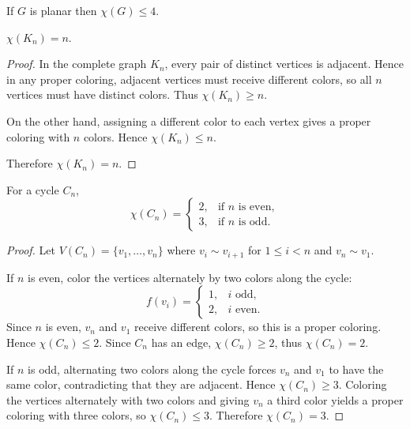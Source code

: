 \documentclass[11pt, a4paper]{ctexrep}
\begin{document}
\begin{theorem}
    If $G$ is planar then $ \chi(G) \le 4 $.
\end{theorem}

\begin{corollary}
    $\chi(K_n)=n$.
\end{corollary}

\begin{proof}
    In the complete graph $K_n$, every pair of distinct vertices is adjacent.
    Hence in any proper coloring, adjacent vertices must receive different
    colors, so all $n$ vertices must have distinct colors. Thus $\chi(K_n)\ge n$.

    On the other hand, assigning a different color to each vertex gives a
    proper coloring with $n$ colors. Hence $\chi(K_n)\le n$.

    Therefore $\chi(K_n)=n$.
\end{proof}

\begin{corollary}
    For a cycle $C_n$,
    \[
        \chi(C_n)=
        \begin{cases}
            2, & \text{if } n \text{ is even}, \\
            3, & \text{if } n \text{ is odd}.
        \end{cases}
    \]
\end{corollary}

\begin{proof}
    Let $V(C_n)=\{v_1,\ldots,v_n\}$ where $v_i\sim v_{i+1}$ for $1\le i<n$ and
    $v_n\sim v_1$.

    If $n$ is even, color the vertices alternately by two colors along the cycle:
    \[
        f(v_i)=
        \begin{cases}
            1, & i \text{ odd},  \\
            2, & i \text{ even}.
        \end{cases}
    \]
    Since $n$ is even, $v_n$ and $v_1$ receive different colors, so this is a proper
    coloring. Hence $\chi(C_n)\le2$. Since $C_n$ has an edge, $\chi(C_n)\ge2$,
    thus $\chi(C_n)=2$.

    If $n$ is odd, alternating two colors along the cycle forces $v_n$ and $v_1$
    to have the same color, contradicting that they are adjacent. Hence
    $\chi(C_n)\ge3$. Coloring the vertices alternately with two colors and giving
    $v_n$ a third color yields a proper coloring with three colors, so
    $\chi(C_n)\le3$. Therefore $\chi(C_n)=3$.
\end{proof}
\end{document}

